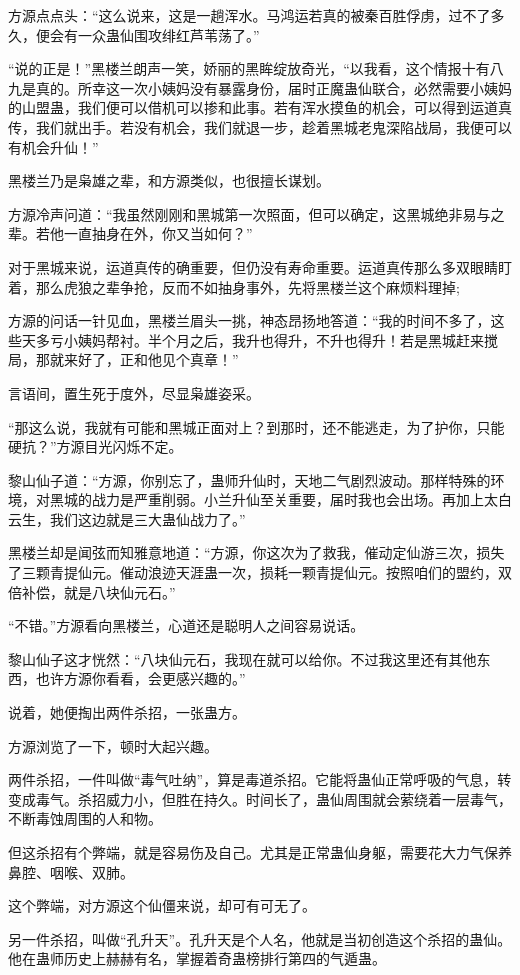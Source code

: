 \begin{this_body}
方源点点头：“这么说来，这是一趟浑水。马鸿运若真的被秦百胜俘虏，过不了多久，便会有一众蛊仙围攻绯红芦苇荡了。”

“说的正是！”黑楼兰朗声一笑，娇丽的黑眸绽放奇光，“以我看，这个情报十有八九是真的。所幸这一次小姨妈没有暴露身份，届时正魔蛊仙联合，必然需要小姨妈的山盟蛊，我们便可以借机可以掺和此事。若有浑水摸鱼的机会，可以得到运道真传，我们就出手。若没有机会，我们就退一步，趁着黑城老鬼深陷战局，我便可以有机会升仙！”

黑楼兰乃是枭雄之辈，和方源类似，也很擅长谋划。

方源冷声问道：“我虽然刚刚和黑城第一次照面，但可以确定，这黑城绝非易与之辈。若他一直抽身在外，你又当如何？”

对于黑城来说，运道真传的确重要，但仍没有寿命重要。运道真传那么多双眼睛盯着，那么虎狼之辈争抢，反而不如抽身事外，先将黑楼兰这个麻烦料理掉;

方源的问话一针见血，黑楼兰眉头一挑，神态昂扬地答道：“我的时间不多了，这些天多亏小姨妈帮衬。半个月之后，我升也得升，不升也得升！若是黑城赶来搅局，那就来好了，正和他见个真章！”

言语间，置生死于度外，尽显枭雄姿采。

“那这么说，我就有可能和黑城正面对上？到那时，还不能逃走，为了护你，只能硬抗？”方源目光闪烁不定。

黎山仙子道：“方源，你别忘了，蛊师升仙时，天地二气剧烈波动。那样特殊的环境，对黑城的战力是严重削弱。小兰升仙至关重要，届时我也会出场。再加上太白云生，我们这边就是三大蛊仙战力了。”

黑楼兰却是闻弦而知雅意地道：“方源，你这次为了救我，催动定仙游三次，损失了三颗青提仙元。催动浪迹天涯蛊一次，损耗一颗青提仙元。按照咱们的盟约，双倍补偿，就是八块仙元石。”

“不错。”方源看向黑楼兰，心道还是聪明人之间容易说话。

黎山仙子这才恍然：“八块仙元石，我现在就可以给你。不过我这里还有其他东西，也许方源你看看，会更感兴趣的。”

说着，她便掏出两件杀招，一张蛊方。

方源浏览了一下，顿时大起兴趣。

两件杀招，一件叫做“毒气吐纳”，算是毒道杀招。它能将蛊仙正常呼吸的气息，转变成毒气。杀招威力小，但胜在持久。时间长了，蛊仙周围就会萦绕着一层毒气，不断毒蚀周围的人和物。

但这杀招有个弊端，就是容易伤及自己。尤其是正常蛊仙身躯，需要花大力气保养鼻腔、咽喉、双肺。

这个弊端，对方源这个仙僵来说，却可有可无了。

另一件杀招，叫做“孔升天”。孔升天是个人名，他就是当初创造这个杀招的蛊仙。他在蛊师历史上赫赫有名，掌握着奇蛊榜排行第四的气遁蛊。


\end{this_body}
